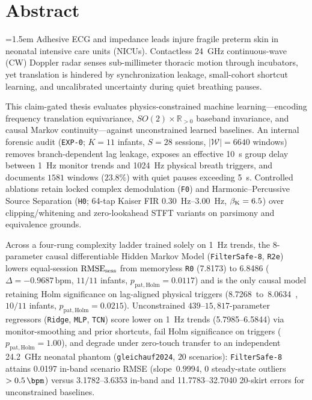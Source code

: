 \chapter*{Abstract}

{\emergencystretch=1.5em
Adhesive ECG and impedance leads injure fragile preterm skin in neonatal intensive care units
(NICUs). Contactless \SI{24}{\giga\hertz} continuous-wave (CW) Doppler radar senses
sub-millimeter thoracic motion through incubators, yet translation is hindered by
synchronization leakage, small-cohort shortcut learning, and uncalibrated uncertainty during
quiet breathing pauses.

This claim-gated thesis evaluates physics-constrained machine learning---encoding frequency
translation equivariance, $SO(2)\times\mathbb{R}_{>0}$ baseband invariance, and causal Markov
continuity---against unconstrained learned baselines. An internal forensic audit (\texttt{EXP-0};
$K=11$ infants, $S=28$ sessions, $|\mathcal{W}|=6640$ windows) removes branch-dependent lag
leakage, exposes an effective \SI{10}{\second} group delay between \SI{1}{\hertz} monitor trends
and \SI{1024}{\hertz} physical breath triggers, and documents $1581$ windows ($23.8\%$) with
quiet pauses exceeding \SI{5}{\second}. Controlled ablations retain locked complex demodulation
(\texttt{F0}) and Harmonic--Percussive Source Separation (\texttt{H0}; 64-tap Kaiser FIR
\SIrange{0.30}{3.00}{\hertz}, $\beta_{\mathrm{K}}=6.5$) over clipping/whitening and zero-lookahead
STFT variants on parsimony and equivalence grounds.

Across a four-rung complexity ladder trained solely on \SI{1}{\hertz} trends, the $8$-parameter
causal differentiable Hidden Markov Model (\texttt{FilterSafe-8}, \texttt{R2e}) lowers
equal-session $\mathrm{RMSE}_{\mathrm{sess}}$ from memoryless \texttt{R0} (\SI{7.8173}{\bpm}) to \SI{6.8486}{\bpm}
($\Delta=-0.9687\,\mathrm{bpm}$, $11/11$ infants, $p_{\mathrm{pat,Holm}}=0.0117$) and is the
only causal model retaining Holm significance on lag-aligned physical triggers (\SI{8.7268} to
\SI{8.0634}{\bpm}, $10/11$ infants, $p_{\mathrm{pat,Holm}}=0.0215$). Unconstrained
$439$--$15{,}817$-parameter regressors (\texttt{Ridge}, \texttt{MLP}, \texttt{TCN}) score lower
on \SI{1}{\hertz} trends (\SIrange{5.7985}{6.5844}{\bpm}) via monitor-smoothing and prior
shortcuts, fail Holm significance on triggers ($p_{\mathrm{pat,Holm}}=1.00$), and degrade under
zero-touch transfer to an independent \SI{24.2}{\giga\hertz} neonatal phantom
(\texttt{gleichauf2024}, $20$ scenarios): \texttt{FilterSafe-8} attains \SI{0.0197}{\bpm}
in-band scenario RMSE (slope~$0.9994$, $0$ steady-state outliers $>\SI{0.5}{\bpm}$) versus
\SIrange{3.1782}{3.6353}{\bpm} in-band and \SIrange{11.7783}{32.7040}{\bpm} \SI{20}{\bpm}-skirt
errors for unconstrained baselines.

}
